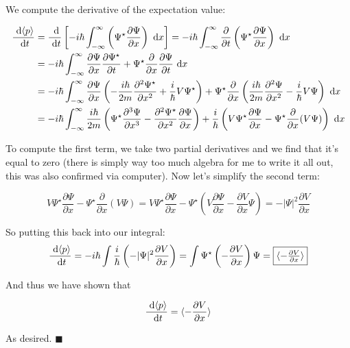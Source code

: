 \documentclass[10pt]{article}
\begin{document}
    \begin{solution}

  
        We compute the derivative of the expectation value:

        \begin{align*}
          \frac{\ \mathrm d\langle p \rangle}{\ \mathrm d t} &= \frac{\ \mathrm d}{\ \mathrm d t}\left[-i\hbar\int_{-\infty}^{\infty}\left(\Psi^\star\frac{\partial\Psi}{\partial x}\right)\ \mathrm d x\right] = -i\hbar\int_{-\infty}^{\infty}\frac{\partial}{\partial t}\left(\Psi^\star\frac{\partial \Psi}{\partial x}\right)\ \mathrm d x\\
          &= -i\hbar\int_{-\infty}^{\infty} \frac{\partial\Psi}{\partial x}\frac{\partial\Psi^\star}{\partial t} + \Psi^\star\frac{\partial}{\partial x}\frac{\partial \Psi}{\partial t}\ \mathrm d x\\
          &= -i\hbar\int_{-\infty}^{\infty} \frac{\partial\Psi}{\partial x}\left(-\frac{i\hbar}{2m}\frac{\partial^2\Psi^\star}{\partial x^2} + \frac{i}{\hbar}V\Psi^\star\right)+ \Psi^\star\frac{\partial}{\partial x}\left(\frac{i\hbar}{2m}\frac{\partial^2\Psi}{\partial x^2} - \frac{i}{\hbar}V\Psi\right)\ \mathrm d x\\
          &= -i\hbar\int_{-\infty}^{\infty}\frac{i\hbar}{2m}\left(\Psi^\star \frac{\partial^3\Psi}{\partial x^3} - \frac{\partial^2\Psi^\star}{\partial x^2}\frac{\partial\Psi}{\partial x}\right) + \frac{i}{\hbar}\left(V\Psi^\star\frac{\partial\Psi}{\partial x} - \Psi^\star\frac{\partial}{\partial x}(V\Psi)\right)\ \mathrm d x
        \end{align*}

        To compute the first term, we take two partial derivatives and we find that it's equal to zero (there is simply way too much algebra for me to write it all out, this was also confirmed via computer). Now let's simplify the second term:


        \[V\Psi^\star\frac{\partial \Psi}{\partial x} - \Psi^\star\frac{\partial}{\partial x}(V\Psi) = V\Psi^\star\frac{\partial\Psi}{\partial x} - \Psi^\star \left( V\frac{\partial\Psi}{\partial x} - \frac{\partial V}{\partial x}\Psi \right)= -|\Psi|^2\frac{\partial V}{\partial x}\]

        So putting this back into our integral: 
        \[\frac{\ \mathrm d\langle p \rangle}{\ \mathrm d t} = -i\hbar\int\frac{i}{\hbar}\left(-|\Psi|^2\frac{\partial V}{\partial x}\right) = \int\Psi^\star\left(-\frac{\partial V}{\partial x}\right)\Psi = \fbox{$\langle -\frac{\partial V}{\partial x} \rangle$}\]
        
        And thus we have shown that 

        \[ \frac{\ \mathrm d \langle p \rangle}{\ \mathrm d t} = \langle - \frac{\partial V}{\partial x} \rangle\]
        
        As desired. $\blacksquare$
    \end{solution}
    \pagebreak
\end{document}
